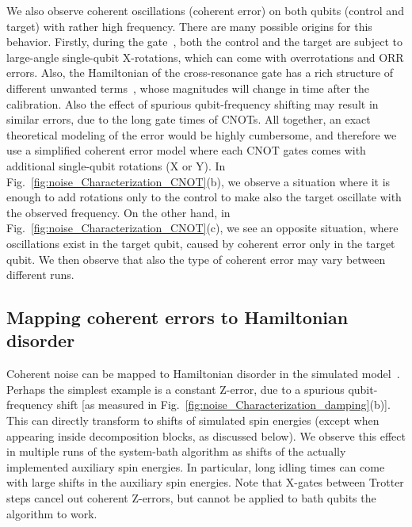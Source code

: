 \documentclass[twocolumn,amsmath,amssymb,pra]{revtex4-2}
\begin{document}
We also observe coherent oscillations (coherent error) on both qubits (control and target) with rather high frequency.
There are many possible origins for this behavior. Firstly,
during the gate~\cite{Sheldon_2016}, both the control and the target are subject to large-angle single-qubit X-rotations,
which can come with overrotations and ORR errors.
Also, the Hamiltonian of the cross-resonance gate has a rich structure of different unwanted terms~\cite{Sheldon_2016},
whose magnitudes will change in time after the calibration.
Also the effect of spurious qubit-frequency shifting may result in similar errors,
due to the long gate times of CNOTs. All together, an exact theoretical modeling of the error would be highly cumbersome,
and therefore we use a simplified coherent error model 
where each CNOT gates comes with additional single-qubit rotations (X or Y).
In Fig.~\ref{fig:noise_Characterization_CNOT}(b), we observe a situation
where it is enough to add rotations only to the control to make also the target oscillate with the observed frequency.
On the other hand, in Fig.~\ref{fig:noise_Characterization_CNOT}(c),
we see an opposite situation, where oscillations exist in the target qubit, caused by coherent error only in the target qubit.
We then observe that also the type of coherent error may vary between different runs.


\subsection{Mapping coherent errors to Hamiltonian disorder}\label{sec:coherent_errors_to_effective_model}
Coherent noise can be mapped to Hamiltonian disorder in the simulated model~\cite{Reiner2018}.
Perhaps the simplest example is
a constant Z-error, due to a spurious qubit-frequency shift [as measured in Fig.~\ref{fig:noise_Characterization_damping}(b)].
This can directly transform to shifts of simulated spin energies
(except when appearing inside decomposition blocks, as discussed below).
We observe this effect in multiple runs of the system-bath algorithm as shifts of the
actually implemented auxiliary spin energies. In particular, long idling times can come with large shifts in the auxiliary spin energies.
Note that X-gates between Trotter steps cancel out coherent Z-errors, but cannot be applied to bath qubits the algorithm to work.
\end{document}
